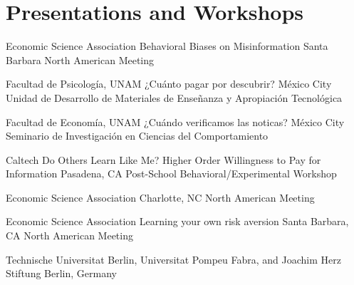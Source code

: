 \section{Presentations and Workshops}



{Economic Science Association}
{Behavioral Biases on Misinformation}
{Santa Barbara}
{}
{North American Meeting}


{Facultad de Psicología, UNAM}
{¿Cuánto pagar por descubrir?}
{México City}
{}
{Unidad de Desarrollo de Materiales de Enseñanza y Apropiación Tecnológica}

{Facultad de Economía, UNAM}
{¿Cuándo verificamos las noticas?}
{México City}
{}
{Seminario de Investigación en Ciencias del Comportamiento }

{Caltech}
{Do Others Learn Like Me? Higher Order Willingness to Pay for Information}
{Pasadena, CA}
{}
{Post-School Behavioral/Experimental Workshop}


{Economic Science Association}
{
}
{Charlotte, NC}
{}
{North American Meeting}

{Economic Science Association}
{Learning your own risk aversion}
{Santa Barbara, CA}
{}
{North American Meeting}

{Technische Universitat Berlin, Universitat Pompeu Fabra, and Joachim Herz Stiftung}
{}
{Berlin, Germany}
{}
{}
